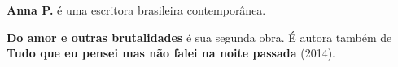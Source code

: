 
\textbf{Anna P.} é uma escritora brasileira contemporânea.

\textbf{Do amor e outras brutalidades} é sua segunda obra. 
É autora também de \textbf{Tudo que eu pensei mas não falei na noite passada} (2014).

